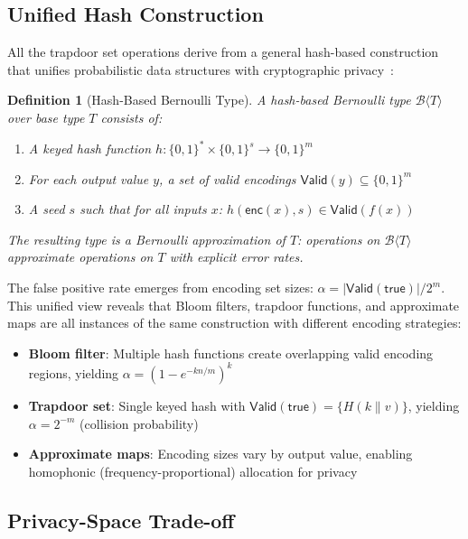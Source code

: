 \documentclass[10pt,conference]{IEEEtran}
\newtheorem{definition}[theorem]{Definition}
\newcommand{\fpr}{\alpha}                   %
\newcommand{\Bernoulli}[1]{\mathcal{B}\langle #1 \rangle}  %
\newcommand{\ValidEnc}[1]{\mathsf{Valid}(#1)}  %
\begin{document}
\subsection{Unified Hash Construction}
\label{sec:unified-hash}

All the trapdoor set operations derive from a general hash-based construction that unifies probabilistic data structures with cryptographic privacy~\cite{bernoulli-types,trapdoor-computing}:

\begin{definition}[Hash-Based Bernoulli Type]
\label{def:hash-bernoulli}
A hash-based Bernoulli type $\Bernoulli{T}$ over base type $T$ consists of:
\begin{enumerate}
\item A keyed hash function $h: \{0,1\}^* \times \{0,1\}^s \rightarrow \{0,1\}^m$
\item For each output value $y$, a set of valid encodings $\ValidEnc{y} \subseteq \{0,1\}^m$
\item A seed $s$ such that for all inputs $x$: $h(\mathsf{enc}(x), s) \in \ValidEnc{f(x)}$
\end{enumerate}
The resulting type is a \emph{Bernoulli approximation} of $T$: operations on $\Bernoulli{T}$ approximate operations on $T$ with explicit error rates.
\end{definition}

The false positive rate emerges from encoding set sizes: $\fpr = |\ValidEnc{\mathsf{true}}|/2^m$. This unified view reveals that Bloom filters, trapdoor functions, and approximate maps are all instances of the same construction with different encoding strategies:
\begin{itemize}
\item \textbf{Bloom filter}: Multiple hash functions create overlapping valid encoding regions, yielding $\fpr = (1 - e^{-kn/m})^k$
\item \textbf{Trapdoor set}: Single keyed hash with $\ValidEnc{\mathsf{true}} = \{H(k \| v)\}$, yielding $\fpr = 2^{-m}$ (collision probability)
\item \textbf{Approximate maps}: Encoding sizes vary by output value, enabling homophonic (frequency-proportional) allocation for privacy
\end{itemize}

\subsection{Privacy-Space Trade-off}
\label{sec:privacy-space}
\end{document}
